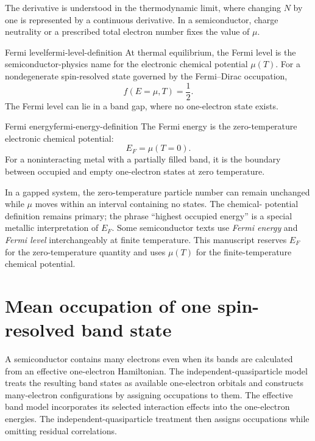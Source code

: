 The derivative is understood in the thermodynamic limit, where changing $N$ by
one is represented by a continuous derivative.  In a semiconductor, charge
neutrality or a prescribed total electron number fixes the value of $\mu$.

\begin{definition}{Fermi level}{fermi-level-definition}
At thermal equilibrium, the Fermi level is the semiconductor-physics name for
the electronic chemical potential $\mu(T)$.  For a nondegenerate spin-resolved
state governed by the Fermi--Dirac occupation,
\begin{equation}
  f(E=\mu,T)=\frac12.
  \label{eq:fermi-level-half-occupation-definition}
\end{equation}
The Fermi level can lie in a band gap, where no one-electron state exists.
\end{definition}

\begin{definition}{Fermi energy}{fermi-energy-definition}
The Fermi energy is the zero-temperature electronic chemical potential:
\begin{equation}
  \boxed{E_F=\mu(T=0).}
  \label{eq:fermi-energy-zero-temperature-definition}
\end{equation}
For a noninteracting metal with a partially filled band, it is the boundary
between occupied and empty one-electron states at zero temperature.
\end{definition}

In a gapped system, the zero-temperature particle number can remain unchanged
while $\mu$ moves within an interval containing no states.  The chemical-
potential definition remains primary; the phrase ``highest occupied energy''
is a special metallic interpretation of $E_F$.  Some semiconductor texts use
\emph{Fermi energy} and \emph{Fermi level} interchangeably at finite
temperature.  This manuscript reserves $E_F$ for the zero-temperature quantity
and uses $\mu(T)$ for the finite-temperature chemical potential.

\section{Mean occupation of one spin-resolved band state}

A semiconductor contains many electrons even when its bands are calculated
from an effective one-electron Hamiltonian.  The independent-quasiparticle
model treats the resulting band states as available one-electron orbitals and
constructs many-electron configurations by assigning occupations to them.
The effective band model incorporates its selected interaction effects into the
one-electron energies.  The independent-quasiparticle treatment then assigns
occupations while omitting residual correlations.

